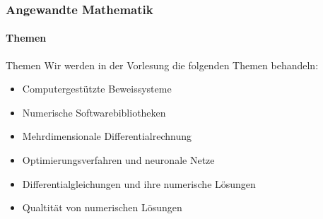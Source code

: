 \documentclass{beamer}
\begin{document}
 \begin{frame}
    \frametitle{Angewandte Mathematik}
\framesubtitle{Themen}
    \begin{block}{Themen}
        Wir werden in der Vorlesung die folgenden Themen behandeln:
        \begin{itemize}
            \item Computergestützte Beweissysteme
            \item Numerische Softwarebibliotheken
            \item Mehrdimensionale Differentialrechnung
            \item Optimierungsverfahren und neuronale Netze
            \item Differentialgleichungen und ihre numerische Lösungen
            \item Qualtität von numerischen Lösungen
        \end{itemize}
    \end{block}
 \end{frame}
\end{document}
